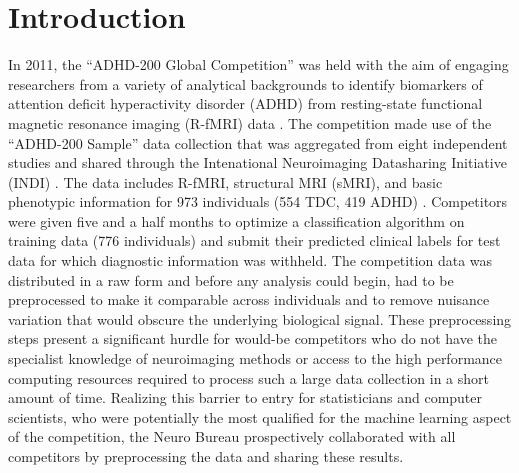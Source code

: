 \documentclass[preprint,12pt,1p]{elsarticle}
\begin{document}

\section{Introduction}

In 2011, the ``ADHD-200 Global Competition'' was held with the aim of engaging researchers from a variety of analytical backgrounds to identify biomarkers of attention deficit hyperactivity disorder (ADHD) from resting-state functional magnetic resonance imaging (R-fMRI) data \cite{Milham2012}. The competition made use of the ``ADHD-200 Sample'' data collection that was aggregated from eight independent studies and shared through the Intenational Neuroimaging Datasharing Initiative (INDI) \cite{Mennes2013}. The data includes R-fMRI, structural MRI (sMRI), and basic phenotypic information for 973 individuals (554 TDC, 419 ADHD) \cite{Milham2012}. Competitors were given five and a half months to optimize a classification algorithm on training data (776 individuals) and submit their predicted clinical labels for test data for which diagnostic information was withheld. The competition data was distributed in a raw form and before any analysis could begin, had to be preprocessed to make it comparable across individuals and to remove nuisance variation that would obscure the underlying biological signal. These preprocessing steps present a significant hurdle for would-be competitors who do not have the specialist knowledge of neuroimaging methods or access to the high performance computing resources required to process such a large data collection in a short amount of time. Realizing this barrier to entry for  statisticians and computer scientists, who were potentially the most qualified for the machine learning aspect of the competition, the Neuro Bureau prospectively collaborated with all competitors by preprocessing the data and sharing these results.
\end{document}
